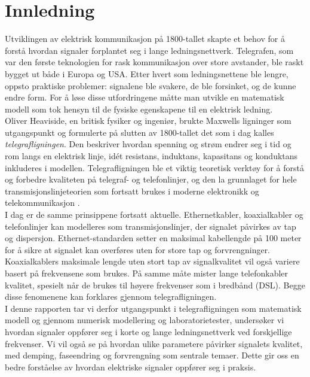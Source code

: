 \section{Innledning}

Utviklingen av elektrisk kommunikasjon på 1800-tallet skapte et behov for å forstå hvordan 
signaler forplantet seg i lange ledningsnettverk. Telegrafen, som var den første teknologien 
for rask kommunikasjon over store avstander, ble raskt bygget ut både i Europa og USA. Etter hvert 
som ledningsnettene ble lengre, oppsto praktiske problemer: signalene ble svakere, de ble 
forsinket, og de kunne endre form. For å løse disse utfordringene måtte man utvikle en matematisk 
modell som tok hensyn til de fysiske egenskapene til en elektrisk ledning.
\\[1em]
Oliver Heaviside, en britisk fysiker og ingeniør, brukte Maxwells ligninger som utgangspunkt og 
formulerte på slutten av 1800-tallet det som i dag kalles \textit{telegrafligningen}. Den beskriver 
hvordan spenning og strøm endrer seg i tid og rom langs en elektrisk linje, idét 
resistans, induktans, kapasitans og konduktans inkluderes i modellen. Telegrafligningen ble et viktig teoretisk verktøy 
for å forstå og forbedre kvaliteten på telegraf- og telefonlinjer, og den la grunnlaget for hele 
transmisjonslinjeteorien som fortsatt brukes i moderne elektronikk og telekommunikasjon \cite{geeksforgeeks_telegrapher}.
\\[1em]
I dag er de samme prinsippene fortsatt aktuelle. Ethernetkabler, koaxialkabler og telefonlinjer kan modelleres 
som transmisjonslinjer, der signalet påvirkes av tap og dispersjon. Ethernet-standarden setter en 
maksimal kabellengde på 100 meter for å sikre at signalet kan overføres uten for store tap og 
forvrengninger. Koaxialkablers maksimale lengde uten stort tap av signalkvalitet vil også variere basert på frekvensene 
som brukes. På samme måte mister lange telefonkabler kvalitet, spesielt når de brukes til høyere 
frekvenser som i bredbånd (DSL). Begge disse fenomenene kan forklares gjennom telegrafligningen.
\\[1em]
I denne rapporten tar vi derfor utgangspunkt i telegrafligningen som matematisk modell og gjennom numerisk
modellering og laboratorietester, undersøker vi hvordan signaler oppfører seg i korte og 
lange ledningsnettverk ved forskjellige frekvenser. Vi vil også se på hvordan ulike parametere påvirker 
signalets kvalitet, med demping, faseendring og forvrengning som sentrale temaer. Dette gir oss en bedre forståelse av
hvordan elektriske signaler oppfører seg i praksis. 